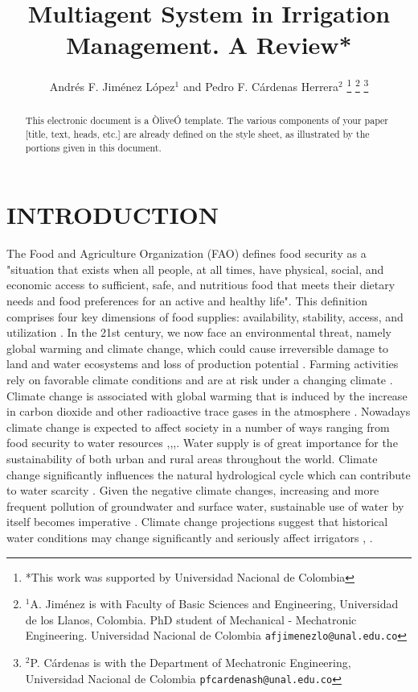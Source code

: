 \documentclass[letterpaper, 10 pt, conference]{ieeeconf}  %
\title{\LARGE \bf
Multiagent System in Irrigation Management. A Review*
}
\author{Andr\'es F. Jim\'enez L\'opez$^{1}$ and Pedro F. C\'ardenas Herrera$^{2}$%
\thanks{*This work was supported by Universidad Nacional de Colombia}%
\thanks{$^{1}$A. Jim\'enez is with Faculty of Basic Sciences and Engineering, Universidad de los Llanos, Colombia. PhD student of Mechanical - Mechatronic Engineering. Universidad Nacional de Colombia
        {\tt\small afjimenezlo@unal.edu.co}}%
\thanks{$^{2}$P. C\'ardenas is with the Department of Mechatronic Engineering, Universidad Nacional de Colombia
        {\tt\small pfcardenash@unal.edu.co}}%
}
\begin{document}
\maketitle
\thispagestyle{empty}
\pagestyle{empty}


\begin{abstract}

This electronic document is a ÒliveÓ template. The various components of your paper [title, text, heads, etc.] are already defined on the style sheet, as illustrated by the portions given in this document.

\end{abstract}


\section{INTRODUCTION}

The Food and Agriculture Organization (FAO) defines food security as a "situation that exists when all people, at all times, have physical, social, and economic access to sufficient, safe, and nutritious food that meets their dietary needs and food preferences for an active and healthy life". This definition comprises four key dimensions of food supplies: availability, stability, access, and utilization \cite{schmidhuber2007global}. In the 21st century, we now face an  environmental threat, namely global warming and climate change, which could cause irreversible damage to land and water ecosystems and loss of production potential \cite{fischer2002climate}. Farming activities rely on favorable climate conditions and are at risk under a changing climate \cite{niles2016farmer}.\\

Climate change is associated with global warming that is induced by the increase in carbon dioxide and other radioactive trace gases in the atmosphere \cite{tekle2015assessment}. Nowadays climate change is expected to affect society in a number of ways ranging from food security to water resources \cite{fischer2002climate},\cite{tekle2015assessment},\cite{Perez2016},\cite{Bobojonov2016}. Water supply is of great importance for the sustainability of both urban and rural areas throughout the world. Climate change significantly influences the natural hydrological cycle which can contribute to water scarcity \cite{shadkam2016impacts}. Given the negative climate changes, increasing and more frequent pollution of groundwater and surface water, sustainable use of water by itself becomes imperative \cite{djurin2015sustainable}. Climate change projections suggest that historical water conditions may change significantly and seriously affect irrigators \cite{Perez2016}, \cite{doll2002impact}.\\
\end{document}
